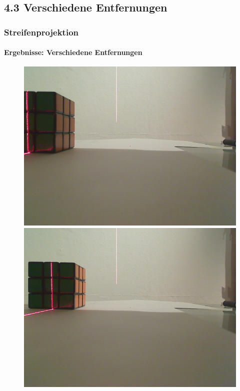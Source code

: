\documentclass{beamer}
\begin{document}
\subsection{4.3 \hspace{5px} Verschiedene Entfernungen}
\begin{frame}
	\frametitle{Streifenprojektion}
	\framesubtitle{Ergebnisse: Verschiedene Entfernungen}

	\begin{figure}
		\begin{minipage}{0.32\linewidth}
			\includegraphics[width=\linewidth]{includes/test_dist_1}
		\end{minipage}
		\hfill
		\begin{minipage}{0.32\linewidth}
			\includegraphics[width=\linewidth]{includes/test_dist_2}

\end{minipage}
\end{figure}
\end{frame}
\end{document}
